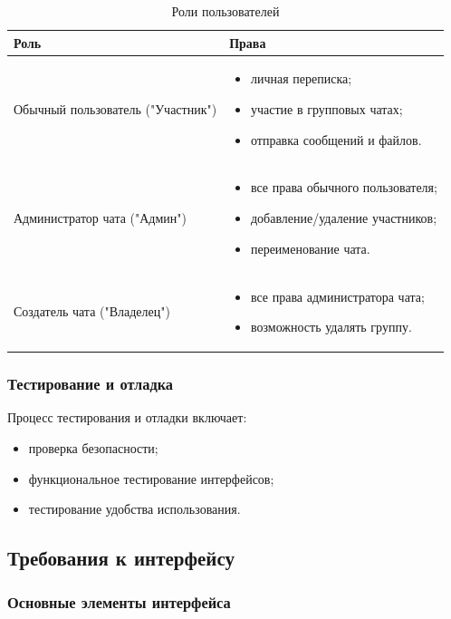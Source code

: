 \begin{xltabular}{\textwidth}{|X|X|}
	\caption{Роли пользователей}\label{tab:roles} \\ \hline
	\centrow Роль & \centrow Права \\ \hline
	\endfirsthead
	Обычный пользователь ("Участник") & 
	\begin{itemize}
		\item личная переписка;
		\item участие в групповых чатах;
		\item отправка сообщений и файлов.
	\end{itemize} \\ \hline
	Администратор чата ("Админ") & 
	\begin{itemize}
		\item все права обычного пользователя;
		\item добавление/удаление участников;
		\item переименование чата.
	\end{itemize} \\ \hline
	Создатель чата ("Владелец") &
	\begin{itemize}
		\item все права администратора чата;
		\item возможность удалять группу.
	\end{itemize} \\ \hline
\end{xltabular}

\subsubsection{Тестирование и отладка}  
Процесс тестирования и отладки включает:  
\begin{itemize}  
	\item проверка безопасности;  
	\item функциональное тестирование интерфейсов;  
	\item тестирование удобства использования.  
\end{itemize}  
\newpage
\subsection{Требования к интерфейсу}

\subsubsection{Основные элементы интерфейса}

